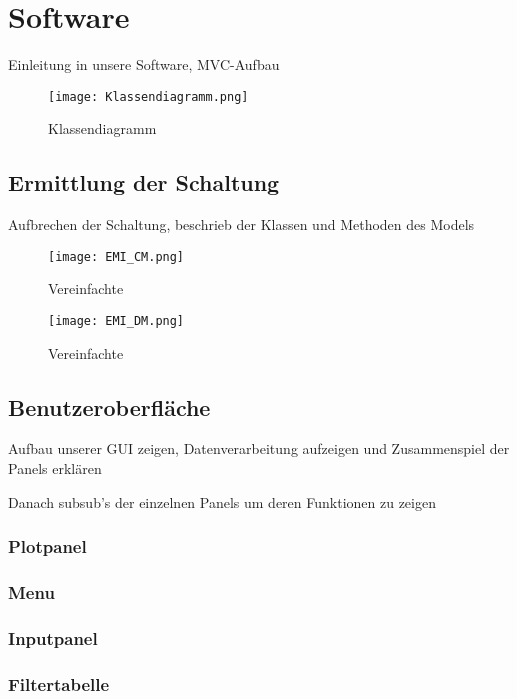 \section{Software} \label{sec:software}
Einleitung in unsere Software, MVC-Aufbau
\begin{figure}[H]
	\begin{minipage}[h]{0.45\linewidth}
		\centering
		\texttt{[image: Klassendiagramm.png]}
		\label{fig:piImpedance}
		\caption{Klassendiagramm \cite{wtf}}
	\end{minipage}
\end{figure}

\subsection{Ermittlung der Schaltung} \label{subsec:ermittlung}
Aufbrechen der Schaltung, beschrieb der Klassen und Methoden des Models

\begin{figure}[H]
	\begin{minipage}[h]{0.45\linewidth}
		\centering
		\texttt{[image: EMI\_CM.png]}
		\label{fig:piImpedance}
		\caption{Vereinfachte \cite{CM_Schaltung}}
	\end{minipage}
\end{figure}

\begin{figure}[H]
	\begin{minipage}[h]{0.45\linewidth}
		\centering
		\texttt{[image: EMI\_DM.png]}
		\label{fig:piImpedance}
		\caption{Vereinfachte \cite{DM-Schaltung}}
	\end{minipage}
\end{figure}


\subsection{Benutzeroberfläche} \label{subsec:benutzeroberflaeche}
Aufbau unserer GUI zeigen, Datenverarbeitung aufzeigen und Zusammenspiel der Panels erklären

Danach subsub's der einzelnen Panels um deren Funktionen zu zeigen


\subsubsection{Plotpanel} \label{subsubsec:plotpanel}



\subsubsection{Menu}\label{subsubsec:menu}


\subsubsection{Inputpanel} \label{subsubsec:inputpanel}


\subsubsection{Filtertabelle} \label{subsubsec:filtertabelle}





